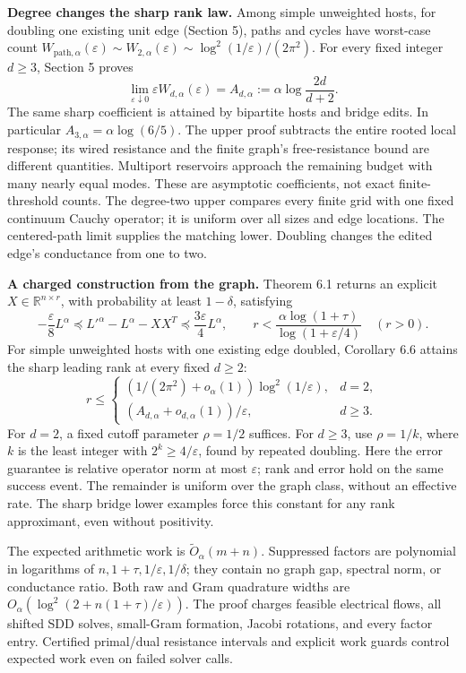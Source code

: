 \documentclass[11pt]{article}
\begin{document}
\textbf{Degree changes the sharp rank law.}
Among simple unweighted hosts, for doubling one existing unit edge
(Section 5), paths and cycles have
worst-case count
$W_{\mathrm{path},\alpha}(\varepsilon)\sim W_{2,\alpha}(\varepsilon)
\sim\log^2(1/\varepsilon)/(2\pi^2)$. For every fixed integer $d\ge3$,
Section 5 proves
\[
 \lim_{\varepsilon\downarrow0}\varepsilon W_{d,\alpha}(\varepsilon)
 =A_{d,\alpha}:=\alpha\log\frac{2d}{d+2}.
\]
The same sharp coefficient is attained by bipartite hosts and bridge
edits. In particular $A_{3,\alpha}=\alpha\log(6/5)$.
The upper proof subtracts the entire rooted local response; its wired
resistance and the finite graph's free-resistance bound are different
quantities. Multiport reservoirs approach the remaining budget with
many nearly equal modes. These are asymptotic coefficients, not exact
finite-threshold counts. The degree-two upper compares every finite grid
with one fixed continuum Cauchy operator; it is uniform over all sizes
and edge locations. The centered-path limit supplies the matching lower. Doubling changes the edited edge's conductance from one to two.

\newpage
\textbf{A charged construction from the graph.}
Theorem 6.1 returns an explicit $X\in\mathbb R^{n\times r}$, with
probability at least $1-\delta$, satisfying
\[
 -\frac\varepsilon8L^\alpha
 \preceq L'^\alpha-L^\alpha-XX^T
 \preceq\frac{3\varepsilon}4L^\alpha,
 \qquad
 r<\frac{\alpha\log(1+\tau)}{\log(1+\varepsilon/4)}\quad(r>0).
\]
For simple unweighted hosts with one existing edge doubled,
Corollary 6.6 attains the sharp leading rank at every fixed $d\ge2$:
\[
 r\le
 \begin{cases}
 (1/(2\pi^2)+o_\alpha(1))\log^2(1/\varepsilon),&d=2,\\
 (A_{d,\alpha}+o_{d,\alpha}(1))/\varepsilon,&d\ge3.
 \end{cases}
\]
For $d=2$, a fixed cutoff parameter $\rho=1/2$ suffices. For $d\ge3$,
use $\rho=1/k$, where $k$ is the least integer with $2^k\ge4/\varepsilon$,
found by repeated doubling.
Here the error guarantee is relative operator norm at most $\varepsilon$;
rank and error hold on the same success event. The remainder is uniform
over the graph class, without an effective rate. The sharp bridge lower
examples force this constant for any rank approximant, even without
positivity.

The expected arithmetic work is $\widetilde O_\alpha(m+n)$.
Suppressed factors are polynomial in logarithms of
$n,1+\tau,1/\varepsilon,1/\delta$; they contain no graph gap,
spectral norm, or conductance ratio. Both raw and Gram quadrature widths
are $O_\alpha(\log^2(2+n(1+\tau)/\varepsilon))$.
The proof charges feasible electrical flows, all shifted SDD solves,
small-Gram formation, Jacobi rotations, and every factor entry.
Certified primal/dual resistance intervals and explicit work guards
control expected work even on failed solver calls.
\end{document}
